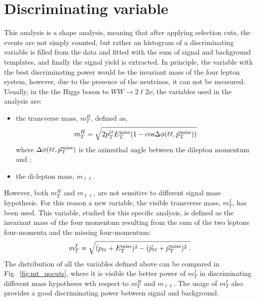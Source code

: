 \section{Discriminating variable}
This analysis is a shape analysis, meaning that after applying selection cuts, the events are not simply counted, but rather an histogram of a discriminating variable is filled from the data and fitted with the sum of signal and background templates, and finally the signal yield is extracted.
In principle, the variable with the best discriminating power would be the invariant mass of
the four lepton system, however, due to the presence of the neutrinos, it can not be measured.
Usually, in the the Higgs boson to $WW \to 2\ell 2\nu $, the variables used in the analysis are:
\begin{itemize}
\item the transverse mass, $m_T^H$, defined as,  
\begin{equation}
 m_T^H = \sqrt{2p_{\rm T}^{\ell\ell}E_{\mathrm{T}}^{\text{miss}}(1-\mathrm{cos}\Delta\phi(\ell\ell, {\vec p}_{\mathrm{T}}^{\kern1pt\text{miss}}))}
\end{equation}
where $\Delta\phi(\ell\ell, {\vec p}_{\mathrm{T}}^{\kern1pt\text{miss}})$ is the azimuthal angle between the dilepton momentum and \ptvecmiss;
\item the di-lepton mass, $m_{\ell \ell}$.
\end{itemize}
However, both $m_T^H$ and $m_{\ell \ell}$, are not sensitive to different
signal mass hypothesis. For this reason a new variable, the visible transverse mass,  $m_T^I$, has been used.
This variable, studied for this specific analysis, is defined as the invariant mass of the four momentum resulting from the sum of the
two leptons four-momenta and the missing four-momentum: 
\begin{equation}
 m_T^I = \sqrt{ (p_\mathrm{\ell\ell} + E_{\mathrm{T}}^{\text{miss}})^2 - (\vec{p}_\mathrm{\ell\ell} + {\vec p}_{\mathrm{T}}^{\kern1pt\text{miss}})^2 \; .}
\end{equation}
The distribution of all the variables defined above can be compared in 
Fig.~\ref{fig:mt_nocuts}, where it is visible the better power of $m_T^I$ in discriminating different mass hypotheses wth respect to  $m_T^H$ and $m_{\ell \ell}$. The usage of  $m_T^I$ also provides a good discriminating power between signal and background.
